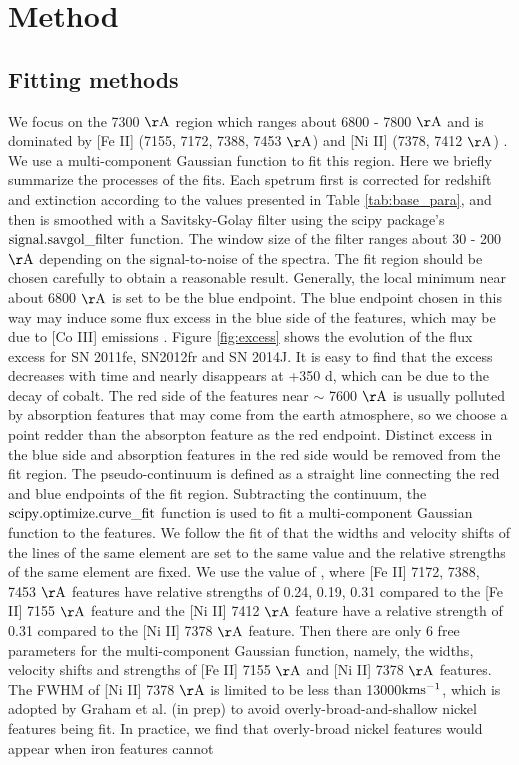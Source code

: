 \documentclass[twocolumn]{aastex631}
\begin{document}
\section{Method} \label{sec:method}

\subsection{Fitting methods \label{subsec:fitting}}

We focus on the 7300 $\rm \AA$ region which ranges about 6800 - 7800 $\rm \AA$ and is dominated by [Fe II] (7155, 7172, 7388, 7453 $\rm \AA$) and [Ni II] (7378, 7412 $\rm \AA$) \citep{2018MNRAS.477.3567M}. We use a multi-component Gaussian function to fit this region. Here we briefly summarize the processes of the fits. Each spetrum first is corrected for redshift and extinction according to the values presented in Table \ref{tab:base_para}, and then is smoothed with a Savitsky-Golay filter using the scipy package’s $\rm signal.savgol\_filter$ function. The window size of the filter ranges about 30 - 200 $\rm \AA$ depending on the signal-to-noise of the spectra. The fit region should be chosen carefully to obtain a reasonable result. Generally, the local minimum near about 6800 $\rm \AA$ is set to be the blue endpoint. The blue endpoint chosen in this way may induce some flux excess in the blue side of the features, which may be due to [Co III] emissions \citep{2020MNRAS.491.2902F}. Figure \ref{fig:excess} shows the evolution of the flux excess for SN 2011fe, SN2012fr and SN 2014J. It is easy to find that the excess decreases with time and nearly disappears at +350 d, which can be due to the decay of cobalt. The red side of the features near $\sim$ 7600 $\rm \AA$ is usually polluted by absorption features that may come from the earth atmosphere, so we choose a point redder than the absorpton feature as the red endpoint. Distinct excess in the blue side and absorption features in the red side would be removed from the fit region. The pseudo-continuum is defined as a straight line connecting the red and blue endpoints of the fit region. Subtracting the continuum, the $\rm scipy.optimize.curve\_fit$ function is used to fit a multi-component Gaussian function to the features. We follow the fit of \citet{2018MNRAS.477.3567M} that the widths and velocity shifts of the lines of the same element are set to the same value and the relative strengths of the same element are fixed. We use the value of \citet{2015AA...573A..12J}, where [Fe II] 7172, 7388, 7453 $\rm \AA$ features have relative strengths of 0.24, 0.19, 0.31 compared to the [Fe II] 7155 $\rm \AA$ feature and the [Ni II] 7412 $\rm \AA$ feature have a relative strength of 0.31 compared to the [Ni II] 7378 $\rm \AA$ feature. Then there are only 6 free parameters for the multi-component Gaussian function, namely, the widths, velocity shifts and strengths of [Fe II] 7155 $\rm \AA$ and [Ni II] 7378 $\rm \AA$ features. The FWHM of [Ni II] 7378 $\rm \AA$ is limited to be less than 13000$\rm km s^{-1}$, which is adopted by Graham et al. (in prep) to avoid overly-broad-and-shallow nickel features being fit. In practice, we find that overly-broad nickel features would appear when iron features cannot 
\end{document}

